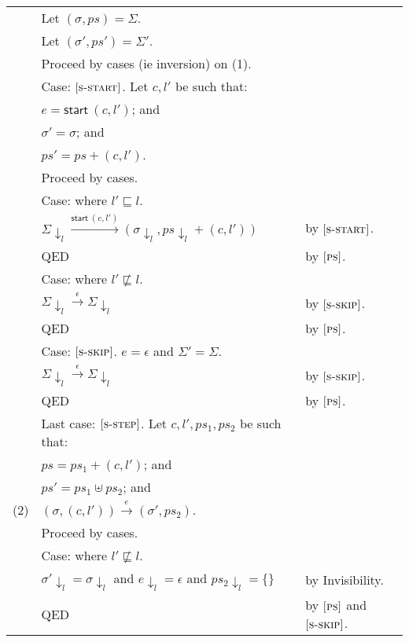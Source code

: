 \documentclass{article}
\newcommand{\rn}[1]{\text{\textsc{[#1]}}}
\newcommand{\tsteparrow}[1]{\overset{#1}{\longrightarrow}}
\newcommand{\tstep}[3]{#2\tsteparrow{#1}#3}
\newcommand{\ssteparrow}[1]{\overset{#1}{\longrightarrow}}
\newcommand{\sstep}[3]{#2\ssteparrow{#1}#3}
\newcommand{\process}[2]{(#1,#2)}
\newcommand{\evstart}[1]{\textsf{start}~#1}
\newcommand{\proj}[2]{#1{\downarrow_{#2}}}
\begin{document}
\begin{tabular}{l@{$\qquad$}l@{$\qquad$}l}
        & Let $(\sigma, ps) = \Sigma$.
\\
        & Let $(\sigma', ps') = \Sigma'$.
\\
        & Proceed by cases (ie inversion) on (1).
\\
        & Case: $\rn{s-start}$. Let $c,l'$ be such that:
\\
        & \z $e=\evstart{\process{c}{l'}}$; and
\\
        & \z $\sigma'=\sigma$; and
\\
        & \z $ps'=ps+\process{c}{l'}$.
\\
        & \z Proceed by cases.
\\
        & \z Case: where $l'\sqsubseteq l$.
\\
        & \z \z $\sstep{\evstart{\process{c}{l'}}}{\proj{\Sigma}{l}}{(\proj{\sigma}{l},\proj{ps}{l}+\process{c}{l'})}$
        & by  $\rn{s-start}$.
\\
        & \z \z QED
        & by  $\rn{ps}$.
\\
       & \z Case: where $l'\not\sqsubseteq l$.
\\
        & \z \z $\sstep{\epsilon}{\proj{\Sigma}{l}}{\proj{\Sigma}{l}}$
        & by  $\rn{s-skip}$.
\\
        & \z \z QED
        & by  $\rn{ps}$.
\\
        & Case: $\rn{s-skip}$. $e=\epsilon$ and $\Sigma'=\Sigma$.
\\
        & \z $\sstep{\epsilon}{\proj{\Sigma}{l}}{\proj{\Sigma}{l}}$
        & by  $\rn{s-skip}$.
\\
        & \z QED
        & by  $\rn{ps}$.
\\
        & Last case: $\rn{s-step}$. Let $c,l',ps_1,ps_2$ be such that:
\\
        & $ps=ps_1+\process{c}{l'}$; and
\\
        & $ps'=ps_1\uplus ps_2$; and
\\
  (2)   & $\tstep{e}{(\sigma,\process{c}{l'})}{(\sigma',ps_2)}$.
\\
        & Proceed by cases.
\\
        & Case: where $l'\not\sqsubseteq l$.
\\
        & \z $\proj{\sigma'}{l}=\proj{\sigma}{l}$ and $\proj{e}{l}=\epsilon$ and $\proj{ps_2}{l}=\{\}$
        & by Invisibility.
\\
        & \z QED
        & by  $\rn{ps}$ and $\rn{s-skip}$.
\\

\end{tabular}
\end{document}
